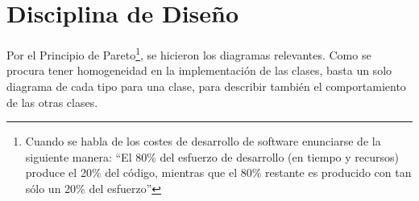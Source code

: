 
\chapter{Disciplina de Diseño}
\label{chap:disenio}

Por el Principio de Pareto\footnote{Cuando se habla de los costes de desarrollo de software enunciarse de la siguiente manera: ``El 80\% del esfuerzo de desarrollo (en tiempo y recursos) produce el 20\% del código, mientras que el 80\% restante es producido con tan sólo un 20\% del esfuerzo''}, se hicieron los diagramas relevantes. Como se procura tener homogeneidad en la implementación de las clases, basta un solo diagrama de cada tipo para una clase, para describir también el comportamiento de las otras clases.

